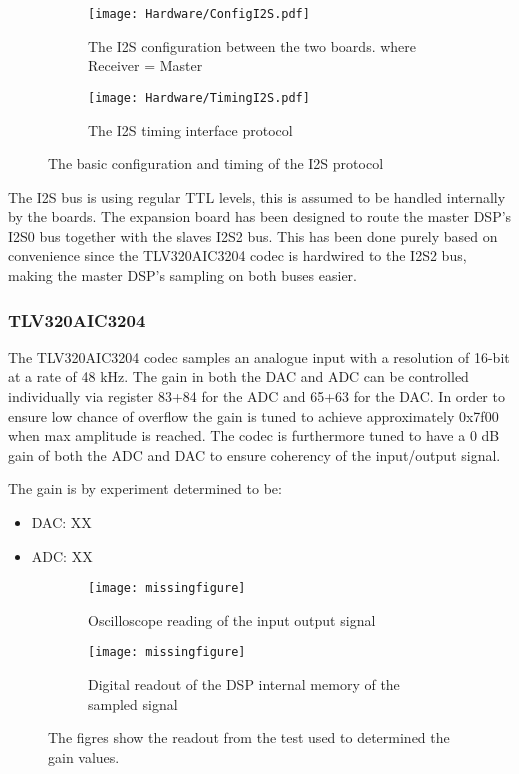 \begin{figure}[H]
	\centering
	\begin{subfigure}[b]{.45\textwidth}
		\centering
		\texttt{[image: Hardware/ConfigI2S.pdf]}
		\caption{The I2S configuration between the two boards. where Receiver = Master}
		\label{fig:I2Sconfig}
	\end{subfigure}
	\hfill
	\begin{subfigure}[b]{.45\textwidth}
		\centering
		\texttt{[image: Hardware/TimingI2S.pdf]}
		\caption{The I2S timing interface protocol}
		\label{fig:I2STiming}
	\end{subfigure}	
	\caption{The basic configuration and timing of the I2S protocol}
\end{figure}

The I2S bus is using regular TTL levels, this is assumed to be handled internally by the boards. The expansion board has been designed to route the master DSP's I2S0 bus together with the slaves I2S2 bus. This has been done purely based on convenience since the TLV320AIC3204 codec is hardwired to the I2S2 bus, making the master DSP's sampling on both buses easier.

\subsubsection*{TLV320AIC3204}

The TLV320AIC3204 codec samples an analogue input with a resolution of 16-bit at a rate of 48 kHz. The gain in both the DAC and ADC can be controlled individually via register 83+84 for the ADC and 65+63 for the DAC. In order to ensure low chance of overflow the gain is tuned to achieve approximately 0x7f00 when max amplitude is reached. The codec is furthermore tuned to have a 0 dB gain of both the ADC and DAC to ensure coherency of the input/output signal.

The gain is by experiment determined to be:
\begin{itemize}
	\item DAC: XX
	\item ADC: XX
\end{itemize}

\begin{figure}[H]
	\centering
	\begin{subfigure}[b]{.45\textwidth}
		\centering
		\texttt{[image: missingfigure]}
		\caption{Oscilloscope reading of the input output signal}
		\label{fig:I2Sconfig}
	\end{subfigure}
	\hfill
	\begin{subfigure}[b]{.45\textwidth}
		\centering
		\texttt{[image: missingfigure]}
		\caption{Digital readout of the DSP internal memory of the sampled signal}
		\label{fig:I2STiming}
	\end{subfigure}	
	\caption{The figres show the readout from the test used to determined the gain values.}
\end{figure}


